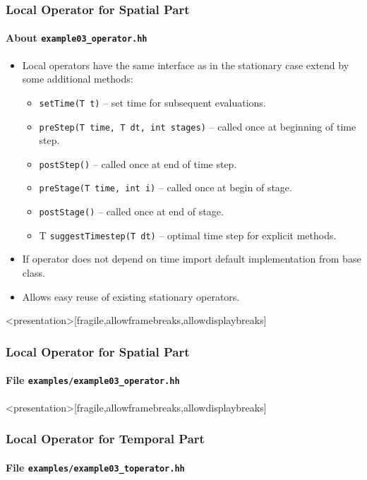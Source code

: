 \begin{frame}
\frametitle{Local Operator for Spatial Part}
\framesubtitle{About \lstinline{example03_operator.hh}}
\begin{itemize}
\item Local operators have the same interface as in the stationary case extend by some additional methods:
\begin{itemize}
\item \lstinline{setTime(T t)} -- set time for subsequent evaluations.
\item \lstinline{preStep(T time, T dt, int stages)} -- called once at beginning of time step.
\item \lstinline{postStep()} -- called once at end of time step.
\item \lstinline{preStage(T time, int i)} -- called once at begin of stage.
\item \lstinline{postStage()} -- called once at end of stage.
\item T \lstinline{suggestTimestep(T dt)} -- optimal time step for explicit methods.
\end{itemize}
\item If operator does not depend on time import default implementation from base class.
\item Allows easy reuse of existing stationary operators.
\end{itemize}
\end{frame}

\begin{frame}<presentation>[fragile,allowframebreaks,allowdisplaybreaks]
\frametitle<presentation>{Local Operator for Spatial Part}
\framesubtitle<presentation>{File \texttt{examples/example03\_operator.hh}}

\end{frame}

\begin{frame}<presentation>[fragile,allowframebreaks,allowdisplaybreaks]
\frametitle<presentation>{Local Operator for Temporal Part}
\framesubtitle<presentation>{File \texttt{examples/example03\_toperator.hh}}

\end{frame}

